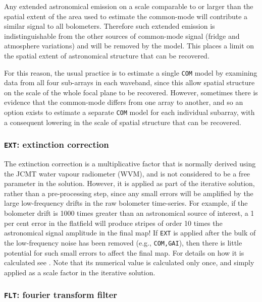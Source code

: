 \documentclass[useAMS,usenatbib,nofootinbib]{mn2e}
\newcommand{\model}[1]{\texttt{#1}}
\begin{document}
Any extended astronomical emission on a scale comparable to or larger
than the spatial extent of the area used to estimate the common-mode will
contribute a similar signal to all bolometers. Therefore such extended
emission is indistinguishable from the other sources of common-mode
signal (fridge and atmosphere variations) and will be removed by the
model. This places a limit on the spatial extent of astronomical
structure that can be recovered.

For this reason, the usual practice is to estimate a single
\model{COM} model by examining data from all four sub-arrays in each
waveband, since this allow spatial structure on the scale of the whole
focal plane to be recovered. However, sometimes there is evidence that
the common-mode differs from one array to another, and so an option
exists to estimate a separate \model{COM} model for each individual
subarray, with a consequent lowering in the scale of spatial structure
that can be recovered.

\subsubsection{\model{EXT}: extinction correction}
\label{sec:ext}

The extinction correction is a multiplicative factor that is normally
derived using the JCMT water vapour radiometer (WVM), and is not
considered to be a free parameter in the solution. However, it is
applied as part of the iterative solution, rather than a
pre-processing step, since any small errors will be amplified by the
large low-frequency drifts in the raw bolometer time-series. For
example, if the bolometer drift is 1000 times greater than an
astronomical source of interest, a 1 per cent error in the flatfield
will produce stripes of order 10 times the astronomical signal
amplitude in the final map! If \model{EXT} is applied after the bulk
of the low-frequency noise has been removed (e.g., \model{COM,GAI}),
then there is little potential for such small errors to affect the
final map.  For details on how it is calculated see
\citet{dempsey2012}. Note that its numerical value is calculated only
once, and simply applied as a scale factor in the iterative solution.

\subsubsection{\model{FLT}: fourier transform filter}
\label{sec:flt}
\end{document}
